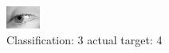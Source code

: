 \begin{figure}[h!]
\begin{center}
\includegraphics[width=0.60\columnwidth]{figures/ID2916_class_3_target_4.png}
\end{center}
\caption{ Classification: 3 actual target: 4}
\label{fig:ID2916_class_3_target_4}
\end{figure}
